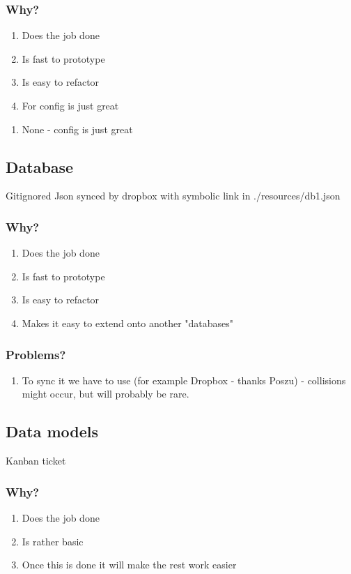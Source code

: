 \subsubsection{Why?}
\begin{enumerate}
    \item Does the job done
    \item Is fast to prototype
    \item Is easy to refactor
    \item For config is just great
\end{enumerate}
\begin{enumerate}
    \item None - config is just great
\end{enumerate}
\subsection{Database}\label{DB:POC}
Gitignored Json synced by dropbox with symbolic link in ./resources/db1.json
\subsubsection{Why?}
\begin{enumerate}
    \item Does the job done
    \item Is fast to prototype
    \item Is easy to refactor
    \item Makes it easy to extend onto another "databases"
\end{enumerate}
\subsubsection{Problems?}
\begin{enumerate}
    \item To sync it we have to use (for example Dropbox - thanks Poszu) - collisions might occur, but will probably be rare.
\end{enumerate}

\subsection{Data models}\label{MODEL:POC}
Kanban ticket
\subsubsection{Why?}
\begin{enumerate}
    \item Does the job done
    \item Is rather basic
    \item Once this is done it will make the rest work easier
\end{enumerate}
